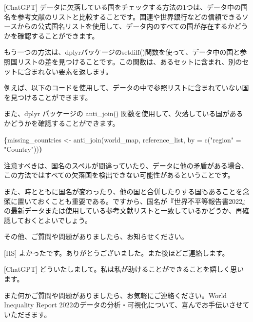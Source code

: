 \documentclass[
]{bxjsbook}
\newenvironment{Shaded}{\begin{snugshade}}{\end{snugshade}}
\newcommand{\AttributeTok}[1]{\textcolor[rgb]{0.77,0.63,0.00}{#1}}
\newcommand{\ErrorTok}[1]{\textcolor[rgb]{0.64,0.00,0.00}{\textbf{#1}}}
\newcommand{\FunctionTok}[1]{\textcolor[rgb]{0.00,0.00,0.00}{#1}}
\newcommand{\NormalTok}[1]{#1}
\newcommand{\OtherTok}[1]{\textcolor[rgb]{0.56,0.35,0.01}{#1}}
\newcommand{\SpecialCharTok}[1]{\textcolor[rgb]{0.00,0.00,0.00}{#1}}
\newcommand{\StringTok}[1]{\textcolor[rgb]{0.31,0.60,0.02}{#1}}
\theoremstyle{definition}
\theoremstyle{definition}
\theoremstyle{definition}
\theoremstyle{definition}
\theoremstyle{remark}
\begin{document}
{[}ChatGPT{]} データに欠落している国をチェックする方法の1つは、データ中の国名を参考文献のリストと比較することです。国連や世界銀行などの信頼できるソースからの公式国名リストを使用して、データ内のすべての国が存在するかどうかを確認することができます。

もう一つの方法は、dplyrパッケージのsetdiff()関数を使って、データ中の国と参照国リストの差を見つけることです。この関数は、あるセットに含まれ、別のセットに含まれない要素を返します。

例えば、以下のコードを使用して、データの中で参照リストに含まれていない国を見つけることができます。

\begin{Shaded}
\end{Shaded}

また、dplyr パッケージの anti\_join() 関数を使用して、欠落している国があるかどうかを確認することができます。

\begin{Shaded}
\begin{Highlighting}[]
\NormalTok{\{missing\_countries }\OtherTok{\textless{}{-}} \FunctionTok{anti\_join}\NormalTok{(world\_map, reference\_list, }\AttributeTok{by =} \FunctionTok{c}\NormalTok{(}\StringTok{"region"} \OtherTok{=} \StringTok{"Country"}\NormalTok{))}\ErrorTok{)}
\end{Highlighting}
\end{Shaded}

注意すべきは、国名のスペルが間違っていたり、データに他の矛盾がある場合、この方法ではすべての欠落国を検出できない可能性があるということです。

また、時とともに国名が変わったり、他の国と合併したりする国もあることを念頭に置いておくことも重要である。ですから、国名が『世界不平等報告書2022』の最新データまたは使用している参考文献リストと一致しているかどうか、再確認しておくとよいでしょう。

その他、ご質問や問題がありましたら、お知らせください。

{[}HS{]} よかったです。ありがとうございました。また後ほどご連絡します。

{[}ChatGPT{]} どういたしまして。私は私が助けることができることを嬉しく思います。

また何かご質問や問題がありましたら、お気軽にご連絡ください。World Inequality Report 2022のデータの分析・可視化について、喜んでお手伝いさせていただきます。
\end{document}
